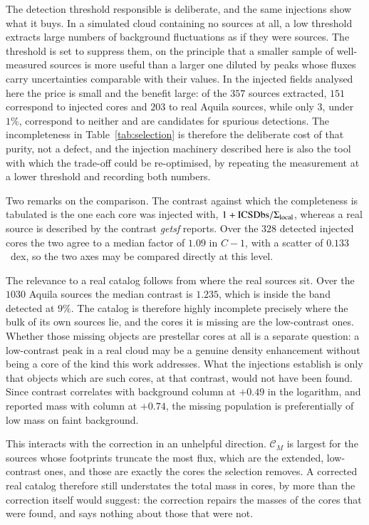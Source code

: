 \documentclass{aa}
\newcommand{\CM}{\mathcal{C}_{M}}
\begin{document}
The detection threshold responsible is deliberate, and the same injections
show what it buys. In a simulated cloud containing no sources at all, a low
threshold extracts large numbers of background fluctuations as if they were
sources. The threshold is set to suppress them, on the principle that a
smaller sample of well-measured sources is more useful than a larger one
diluted by peaks whose fluxes carry uncertainties comparable with their
values. In the injected fields analysed here the price is small and the
benefit large: of the $357$ sources extracted, $151$ correspond to injected
cores and $203$ to real Aquila sources, while only $3$, under $1\%$,
correspond to neither and are candidates for spurious detections. The
incompleteness in Table~\ref{tab:selection} is therefore the deliberate cost
of that purity, not a defect, and the injection machinery described here is
also the tool with which the trade-off could be re-optimised, by repeating the
measurement at a lower threshold and recording both numbers.

Two remarks on the comparison. The contrast against which the completeness is
tabulated is the one each core was injected with,
$1 + {\rm ICSDbs}/\Sigma_{\rm local}$, whereas a real source is
described by the contrast \emph{getsf} reports. Over the $328$ detected
injected cores the two agree to a median factor of $1.09$ in $C-1$, with a
scatter of $0.133$~dex, so the two axes may be compared directly at this
level.

The relevance to a real catalog follows from where the real sources sit. Over
the $1030$ Aquila sources the median contrast is $1.235$, which is inside the
band detected at $9\%$. The catalog is therefore highly incomplete precisely
where the bulk of its own sources lie, and the cores it is missing are the
low-contrast ones.  Whether those missing objects are prestellar cores at all
is a separate question: a low-contrast peak in a real cloud may be a genuine
density enhancement without being a core of the kind this work addresses.
What the injections establish is only that objects which are such cores,
at that contrast, would not have been found. Since contrast correlates with background column at
$+0.49$ in the logarithm, and reported mass with column at $+0.74$, the
missing population is preferentially of low mass on faint background.

This interacts with the correction in an unhelpful direction.
$\CM$ is largest for the sources whose footprints truncate the most flux,
which are the extended, low-contrast ones, and those are exactly the cores the
selection removes. A corrected real catalog therefore still understates the
total mass in cores, by more than the correction itself would suggest: the
correction repairs the masses of the cores that were found, and says nothing
about those that were not.
\end{document}

